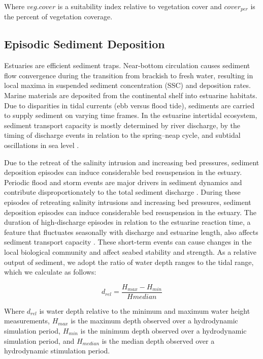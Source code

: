 \documentclass[
]{book}
\begin{document}
Where \(veg.cover\) is a suitability index relative to vegetation cover and \(cover_{per}\) is the percent of vegetation coverage.

\hypertarget{episodic-sediment-deposition-1}{%
\subsection{Episodic Sediment Deposition}\label{episodic-sediment-deposition-1}}

Estuaries are efficient sediment traps. Near-bottom circulation causes sediment flow convergence during the transition from brackish to fresh water, resulting in local maxima in suspended sediment concentration (SSC) and deposition rates. Marine materials are deposited from the continental shelf into estuarine habitats. Due to disparities in tidal currents (ebb versus flood tide), sediments are carried to supply sediment on varying time frames. In the estuarine intertidal ecosystem, sediment transport capacity is mostly determined by river discharge, by the timing of discharge events in relation to the spring--neap cycle, and subtidal oscillations in sea level \citep{prosser_impacts_2018}.

Due to the retreat of the salinity intrusion and increasing bed pressures, sediment deposition episodes can induce considerable bed resuspension in the estuary. Periodic flood and storm events are major drivers in sediment dynamics and contribute disproportionately to the total sediment discharge \citep{ralston_sediment_2013}. During these episodes of retreating salinity intrusions and increasing bed pressures, sediment deposition episodes can induce considerable bed resuspension in the estuary. The duration of high-discharge episodes in relation to the estuarine reaction time, a feature that fluctuates seasonally with discharge and estuarine length, also affects sediment transport capacity \citep{palinkas_sediment_2014}. These short-term events can cause changes in the local biological community and affect seabed stability and strength. As a relative output of sediment, we adopt the ratio of water depth ranges to the tidal range, which we calculate as follows:

\[d_{rel} = \frac{H_{max} - H_{min}}{Hmedian}\]

Where \(d_{rel}\) is water depth relative to the minimum and maximum water height measurements, \(H_{max}\) is the maximum depth observed over a hydrodynamic simulation period, \(H_{min}\) is the minimum depth observed over a hydrodynamic simulation period, and \(H_{median}\) is the median depth observed over a hydrodynamic stimulation period.
\end{document}
